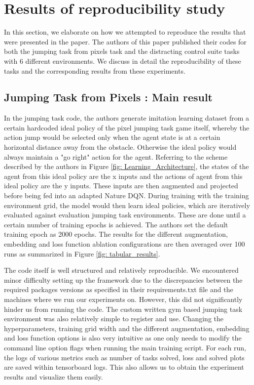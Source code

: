 \documentclass{usiinftr}
\begin{document}
\section{Results of reproducibility study}
In this section, we elaborate on how we attempted to reproduce the results that were presented in the paper. The authors of this paper published their codes for both the jumping task from pixels task and the distracting control suite tasks with 6 different environments. We discuss in detail the reproducibility of these tasks and the corresponding results from these experiments.

\subsection{Jumping Task from Pixels : Main result}
In the jumping task code, the authors generate imitation learning dataset from a certain hardcoded ideal policy of the pixel jumping task game itself, whereby the action jump would be selected only when the agent state is at a certain horizontal distance away from the obstacle. Otherwise the ideal policy would always maintain a "go right" action for the agent. Referring to the scheme described by the authors in Figure \ref{fig: Learning_Architecture}, the states of the agent from this ideal policy are the x inputs and the actions of agent from this ideal policy are the y inputs. These inputs are then augmented and projected before being fed into an adapted Nature DQN. During training with the training environment grid, the model would then learn ideal policies, which are iteratively evaluated against evaluation jumping task environments. These are done until a certain number of training epochs is achieved. The authors set the default training epoch as 2000 epochs. The results for the different augmentation, embedding and loss function ablation configurations are then averaged over 100 runs as summarized in Figure \ref{fig: tabular_results}.

The code itself is well structured and relatively reproducible. We encountered minor difficulty setting up the framework due to the discrepancies between the required packages versions as specified in their requirements.txt file and the machines where we run our experiments on. However, this did not significantly hinder us from running the code. The custom written gym based jumping task environment was also relatively simple to register and use. Changing the hyperparameters, training grid width and the different augmentation, embedding and loss function options is also very intuitive as one only needs to modify the command line option flags when running the main training script. For each run, the logs of various metrics such as number of tasks solved, loss and solved plots are saved within tensorboard logs. This also allows us to obtain the experiment results and visualize them easily. 
\end{document}
